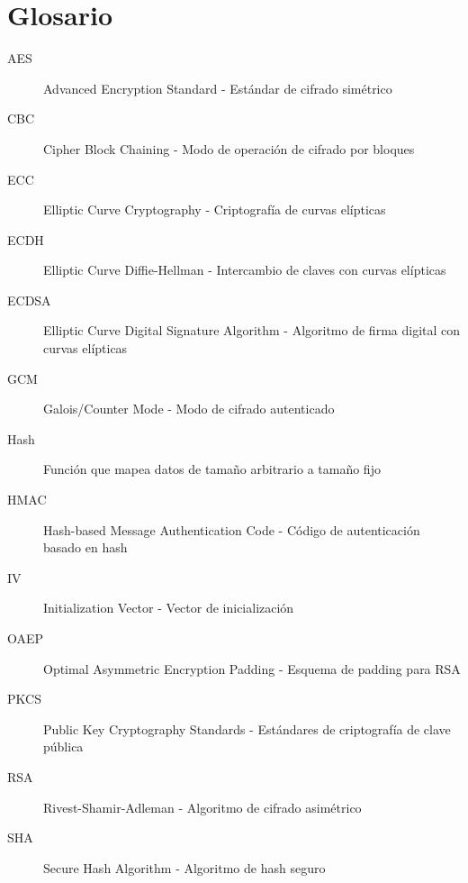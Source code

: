 \documentclass[12pt,a4paper]{article}
\begin{document}
\section{Glosario}

\begin{description}
	\item[AES] Advanced Encryption Standard - Estándar de cifrado simétrico
	\item[CBC] Cipher Block Chaining - Modo de operación de cifrado por bloques
	\item[ECC] Elliptic Curve Cryptography - Criptografía de curvas elípticas
	\item[ECDH] Elliptic Curve Diffie-Hellman - Intercambio de claves con curvas
	      elípticas
	\item[ECDSA] Elliptic Curve Digital Signature Algorithm - Algoritmo de firma digital
	      con curvas elípticas
	\item[GCM] Galois/Counter Mode - Modo de cifrado autenticado
	\item[Hash] Función que mapea datos de tamaño arbitrario a tamaño fijo
	\item[HMAC] Hash-based Message Authentication Code - Código de autenticación basado
	      en hash
	\item[IV] Initialization Vector - Vector de inicialización
	\item[OAEP] Optimal Asymmetric Encryption Padding - Esquema de padding para RSA
	\item[PKCS] Public Key Cryptography Standards - Estándares de criptografía de clave
	      pública
	\item[RSA] Rivest-Shamir-Adleman - Algoritmo de cifrado asimétrico
	\item[SHA] Secure Hash Algorithm - Algoritmo de hash seguro
\end{description}
\end{document}
